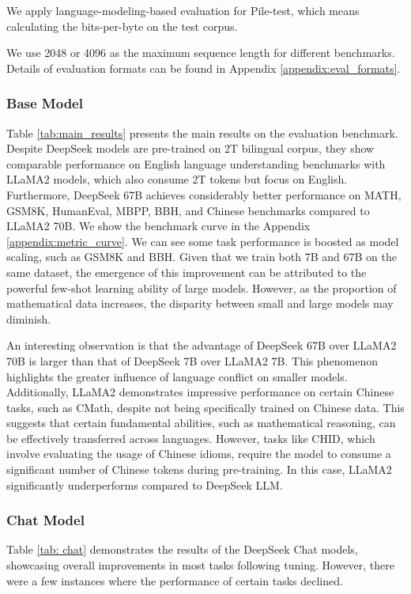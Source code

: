 We apply language-modeling-based evaluation for Pile-test, which means calculating the bits-per-byte on the test corpus.

We use 2048 or 4096 as the maximum sequence length for different benchmarks. Details of evaluation formats can be found in Appendix \ref{appendix:eval_formats}.

\subsubsection{Base Model}

Table \ref{tab:main_results} presents the main results on the evaluation benchmark. Despite DeepSeek models are pre-trained on 2T bilingual corpus, they show comparable performance on English language understanding benchmarks with LLaMA2 models, which also consume 2T tokens but focus on English. Furthermore, DeepSeek 67B achieves considerably better performance on MATH, GSM8K, HumanEval, MBPP, BBH, and Chinese benchmarks compared to LLaMA2 70B. We show the benchmark curve in the Appendix \ref{appendix:metric_curve}.  We can see some task performance is boosted as model scaling, such as GSM8K and BBH.  Given that we train both 7B and 67B on the same dataset, the emergence of this improvement can be attributed to the powerful few-shot learning ability of large models. However, as the proportion of mathematical data increases, the disparity between small and large models may diminish.

An interesting observation is that the advantage of DeepSeek 67B over LLaMA2 70B is larger than that of DeepSeek 7B over LLaMA2 7B. This phenomenon highlights the greater influence of language conflict on smaller models. Additionally, LLaMA2 demonstrates impressive performance on certain Chinese tasks, such as CMath, despite not being specifically trained on Chinese data. This suggests that certain fundamental abilities, such as mathematical reasoning, can be effectively transferred across languages. However, tasks like CHID, which involve evaluating the usage of Chinese idioms, require the model to consume a significant number of Chinese tokens during pre-training. In this case, LLaMA2 significantly underperforms compared to DeepSeek LLM.

\subsubsection{Chat Model}

Table \ref{tab: chat} demonstrates the results of the DeepSeek Chat models, showcasing overall improvements in most tasks following tuning. However, there were a few instances where the performance of certain tasks declined.


